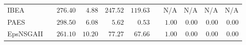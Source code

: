 \begin{table}[b]
{\begin{tabular}{
        |l||
        l|
        r
        r|
        r
        r
        ||l|
        r
        r|
        r
        r|
      }
      IBEA       &                           & $276.40$                         & $4.88$                           & $247.52$        & $119.63$                         &                                 & N/A               & N/A             & N/A                 & N/A              \\
      PAES       &                           & $\mathbf{298.50}$                & $\mathbf{6.08}$                  & $\mathbf{5.62}$ & $\mathbf{0.53}$                  &                                 & $1.00$            & $0.00$          & $0.00$              & $0.00$           \\
      EpsNSGAII  &                           & $261.10$                         & $10.20$                          & $77.27$         & $67.66$                          &                                 & $1.00$            & $0.00$          & $0.00$              & $0.00$           \\
      \hline
    \end{tabular}%
  }
\end{table}

